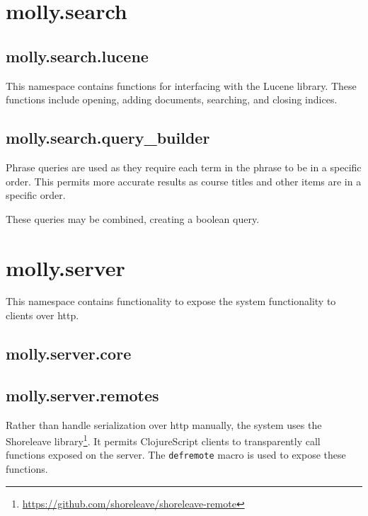	
	\clearpage
	\section{molly.search}
		\subsection{molly.search.lucene}
			This namespace contains functions for interfacing with the Lucene library.  These functions include opening, adding documents, searching, and closing indices.
			
		
		\clearpage
		\subsection{molly.search.query\_builder}
			Phrase queries are used as they require each term in the phrase to be in a specific order.  This permits more accurate results as course titles and other items are in a specific order.
			
			These queries may be combined, creating a boolean query.
			
	
	\clearpage
	\section{molly.server}
		This namespace contains functionality to expose the system functionality to clients over \gls{http}.
		
		\subsection{molly.server.core}
		
		\clearpage
		\subsection{molly.server.remotes}
			Rather than handle serialization over \gls{http} manually, the system uses the Shoreleave library\footnote{\url{https://github.com/shoreleave/shoreleave-remote}}.  It permits ClojureScript clients to transparently call functions exposed on the server.  The \texttt{defremote} macro is used to expose these functions.
			
